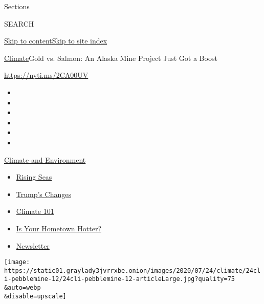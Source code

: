 Sections

SEARCH

\protect\hyperlink{site-content}{Skip to
content}\protect\hyperlink{site-index}{Skip to site index}

\href{/section/climate}{Climate}\textbar{}Gold vs. Salmon: An Alaska
Mine Project Just Got a Boost

\href{https://nyti.ms/2CA00UV}{https://nyti.ms/2CA00UV}

\begin{itemize}
\item
\item
\item
\item
\item
\item
\end{itemize}

\href{https://www.nytimes3xbfgragh.onion/section/climate?action=click\&pgtype=Article\&state=default\&region=TOP_BANNER\&context=storylines_menu}{Climate
and Environment}

\begin{itemize}
\tightlist
\item
  \href{https://www.nytimes3xbfgragh.onion/2020/07/30/climate/sea-level-inland-floods.html?action=click\&pgtype=Article\&state=default\&region=TOP_BANNER\&context=storylines_menu}{Rising
  Seas}
\item
  \href{https://www.nytimes3xbfgragh.onion/interactive/2020/climate/trump-environment-rollbacks.html?action=click\&pgtype=Article\&state=default\&region=TOP_BANNER\&context=storylines_menu}{Trump's
  Changes}
\item
  \href{https://www.nytimes3xbfgragh.onion/interactive/2020/04/19/climate/climate-crash-course-1.html?action=click\&pgtype=Article\&state=default\&region=TOP_BANNER\&context=storylines_menu}{Climate
  101}
\item
  \href{https://www.nytimes3xbfgragh.onion/interactive/2018/08/30/climate/how-much-hotter-is-your-hometown.html?action=click\&pgtype=Article\&state=default\&region=TOP_BANNER\&context=storylines_menu}{Is
  Your Hometown Hotter?}
\item
  \href{https://www.nytimes3xbfgragh.onion/newsletters/climate-change?action=click\&pgtype=Article\&state=default\&region=TOP_BANNER\&context=storylines_menu}{Newsletter}
\end{itemize}

\texttt{[image: https://static01.graylady3jvrrxbe.onion/images/2020/07/24/climate/24cli-pebblemine-12/24cli-pebblemine-12-articleLarge.jpg?quality=75\\\&auto=webp\\\&disable=upscale]}

